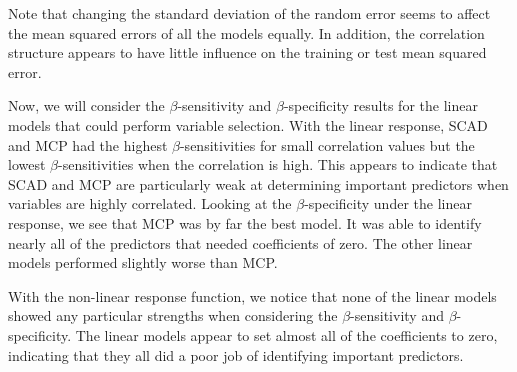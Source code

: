 \documentclass{article}
\begin{document}
	Note that changing the standard deviation of the random error seems to affect the mean squared errors of all the models equally. In addition, the correlation structure appears to have little influence on the training or test mean squared error.
	
	Now, we will consider the $\beta$-sensitivity and $\beta$-specificity results for the linear models that could perform variable selection. With the linear response, SCAD and MCP had the highest $\beta$-sensitivities for small correlation values but the lowest $\beta$-sensitivities when the correlation is high. This appears to indicate that SCAD and MCP are particularly weak at determining important predictors when variables are highly correlated. Looking at the $\beta$-specificity under the linear response, we see that MCP was by far the best model. It was able to identify nearly all of the predictors that needed coefficients of zero. The other linear models performed slightly worse than MCP.
	
	With the non-linear response function, we notice that none of the linear models showed any particular strengths when considering the $\beta$-sensitivity and $\beta$-specificity. The linear models appear to set almost all of the coefficients to zero, indicating that they all did a poor job of identifying important predictors.
	
\end{document}
